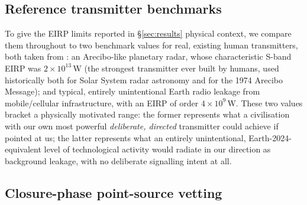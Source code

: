 \documentclass{openjournal}
\begin{document}
\subsection{Reference transmitter benchmarks}
\label{sec:benchmarks}

To give the EIRP limits reported in \S\ref{sec:results} physical context,
we compare them throughout to two benchmark values for real, existing
human transmitters, both taken from \citet{EarthDetectingEarth2025}: an
Arecibo-like planetary radar, whose characteristic S-band EIRP was
$2\times10^{13}$\,W (the strongest transmitter ever built by humans,
used historically both for Solar System radar astronomy and for the 1974
Arecibo Message); and typical, entirely unintentional Earth radio
leakage from mobile/cellular infrastructure, with an EIRP of order
$4\times10^{9}$\,W. These two values bracket a physically motivated
range: the former represents what a civilisation with our own most
powerful \emph{deliberate, directed} transmitter could achieve if
pointed at us; the latter represents what an entirely unintentional,
Earth-2024-equivalent level of technological activity would radiate in
our direction as background leakage, with no deliberate signalling
intent at all.

\subsection{Closure-phase point-source vetting}
\label{sec:closurephase}
\end{document}
